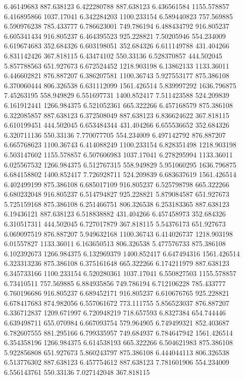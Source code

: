 6.46149683	887.638123
6.422280788	887.638123
6.436561584	1155.578857
6.416895866	1037.17041
6.342284203	1100.233154
6.589440823	757.569885
6.590976238	785.433777
6.786623001	749.786194
6.488434792	916.805237
6.605341434	916.805237
6.464395523	925.228821
7.50205946	554.234009
6.619674683	352.684326
6.603198051	352.684326
6.611149788	431.404266
6.831142426	367.818115
6.43474102	550.33136
6.528370857	444.502045
5.857788563	651.927673
6.672524452	1218.903198
6.13862133	1133.36011
6.446602821	876.887207
6.386207581	1100.36743
5.927553177	875.386108
6.370060444	806.326538
6.631112099	1561.426514
5.839997292	1636.796875
7.45263195	558.949829
6.551697731	1400.852417
7.511423588	524.209839
6.161912441	1266.984375
6.521052361	665.322266
6.457168579	875.386108
6.322085857	887.638123
6.372508049	887.638123
6.836624622	367.818115
6.610199451	444.502045
6.653484344	431.404266
6.655536652	352.684326
6.320711136	550.33136
7.770077705	554.234009
6.497142792	876.887207
6.665768623	1100.36743
6.414088249	1100.233154
6.828351498	1218.903198
6.503147602	1155.578857
6.507606983	1037.17041
6.278295994	1133.36011
6.025567532	1266.984375
6.512767315	558.949829
5.951060295	1636.796875
6.684158802	1400.852417
7.726928711	524.209839
6.683637619	1561.426514
6.402499199	875.386108
6.685017109	916.805237
6.525798798	665.322266
6.680232048	916.805237
6.514794827	925.228821
5.879084587	651.927673
5.725159168	875.386108
6.251466751	806.326538
6.253183365	887.638123
6.19436121	887.638123
6.518838882	431.404266
6.457458973	352.684326
6.310517311	444.502045
6.727017879	367.818115
5.54376173	651.927673
6.069097519	876.887207
5.949632168	1100.36743
6.414026737	1218.903198
6.01557827	1133.36011
6.163650513	806.326538
5.477576733	875.386108
6.102392673	1266.984375
6.132969379	1400.852417
6.647494316	1561.426514
6.323313236	875.386108
6.375161648	665.322266
6.174211979	887.638123
6.345733166	1100.233154
6.520280361	1037.17041
6.550827503	1155.578857
6.73410511	757.569885
6.884935856	749.786194
6.712106228	785.433777
6.760196686	916.805237
6.689452171	916.805237
6.610676765	925.228821
6.678417683	874.982056
6.557061672	773.111755
5.856523037	876.887207
6.336712837	1209.671997
6.720948219	718.657593
6.8327384	654.744446
6.639498711	655.070984
6.667093754	579.964905
6.749499321	852.403687
6.782607555	881.295166
6.799335957	749.684937
6.784647942	1561.426514
6.354358196	1266.984375
6.614538193	665.322266
6.504621983	875.386108
5.922856808	651.927673
5.860243797	875.386108
6.444044113	806.326538
6.513776302	887.638123
6.457754612	887.638123
7.781601906	554.234009
6.556143761	550.33136
7.027142048	367.818115
